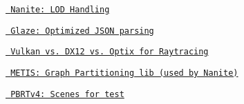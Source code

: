 \begin{DoxyItemize}
\item \href{https://advances.realtimerendering.com/s2021/Karis_Nanite_SIGGRAPH_Advances_2021_final.pdf}{\texttt{ Nanite\+: LOD Handling}}
\item \href{https://github.com/stephenberry/glaze?tab=readme-ov-file}{\texttt{ Glaze\+: Optimized JSON parsing}}
\item \href{https://forums.developer.nvidia.com/t/ray-tracing-performance-in-optix-vs-vulkan-dxr/260558}{\texttt{ Vulkan vs. DX12 vs. Optix for Raytracing}}
\item \href{https://github.com/KarypisLab/METIS}{\texttt{ METIS\+: Graph Partitioning lib (used by Nanite)}}
\item \href{https://github.com/mmp/pbrt-v4-scenes?tab=readme-ov-file}{\texttt{ PBRTv4\+: Scenes for test}} 
\end{DoxyItemize}